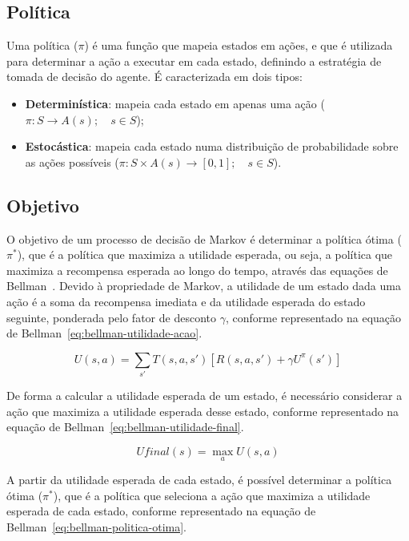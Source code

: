 \subsection{Política}\label{subsec:politica-otima}

Uma política ($\pi$) é uma função que mapeia estados em ações, e que é utilizada para determinar a ação a executar em cada estado, definindo a estratégia de tomada de decisão do agente.
É caracterizada em dois tipos:

\begin{itemize}
    \item \textbf{Determinística}: mapeia cada estado em apenas uma ação ($\pi : S \rightarrow A(s); \quad s \in S$);
    \item \textbf{Estocástica}: mapeia cada estado numa distribuição de probabilidade sobre as ações possíveis ($\pi : S \times A(s) \rightarrow [0,1]; \quad s \in S$).
\end{itemize}

\subsection{Objetivo}\label{subsec:objetivo}

O objetivo de um processo de decisão de Markov é determinar a política ótima ($\pi^*$), que é a política que maximiza a utilidade esperada, ou seja, a política que maximiza a recompensa esperada ao longo do tempo, através das equações de Bellman~\cite{wiki:bellman-equation}.
Devido à propriedade de Markov, a utilidade de um estado dada uma ação é a soma da recompensa imediata e da utilidade esperada do estado seguinte, ponderada pelo fator de desconto $\gamma$, conforme representado na equação de Bellman~\ref{eq:bellman-utilidade-acao}.

\begin{equation}
    \label{eq:bellman-utilidade-acao}
    U(s, a) = \sum_{s'} T(s, a, s') [R(s, a, s') + \gamma U^\pi(s')]
\end{equation}

De forma a calcular a utilidade esperada de um estado, é necessário considerar a ação que maximiza a utilidade esperada desse estado, conforme representado na equação de Bellman~\ref{eq:bellman-utilidade-final}.

\begin{equation}
    \label{eq:bellman-utilidade-final}
    Ufinal(s) = \max_{a} U(s, a)
\end{equation}

A partir da utilidade esperada de cada estado, é possível determinar a política ótima ($\pi^*$), que é a política que seleciona a ação que maximiza a utilidade esperada de cada estado, conforme representado na equação de Bellman~\ref{eq:bellman-politica-otima}.

